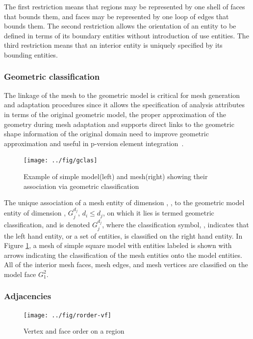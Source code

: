 The first restriction means that regions may be represented by one shell of faces that
bounds them, and faces may be represented by one loop of edges that bounds them. The
second restriction allows the orientation of an entity to be defined in terms of
its boundary entities without introduction of use entities. The third
restriction means that an interior entity is uniquely specified by its bounding entities.


\subsubsection{Geometric classification}

The linkage of the mesh to the geometric model is critical for mesh generation and adaptation 
procedures since it allows the specification of analysis 
attributes in terms of the original geometric model, the proper approximation of
the geometry during mesh adaptation and supports direct links to
the geometric shape information of the original domain need to improve geometric
approximation and useful in p-version element integration~\cite{beallthesis, beall97, shephard00}. 

\begin{figure}
\centering
\texttt{[image: ../fig/gclas]}
\caption[Example of simple model and mesh showing their association via geometric classification]
{Example of simple model(left) and mesh(right) showing
their association via geometric classification~\cite{simmetrixweb}} 
\label{gclas}  %
\end{figure}

The unique association of a mesh entity of dimension \di, \Mdii, to the
 geometric model entity of dimension \djj, $G^{d_j}_j$, $d_i \le d_j$, on which
 it lies is termed geometric classification, and is denoted \Mdiib\clas\blk
 $G^{d_j}_j$, where the classification symbol, \clas,
indicates that the left hand entity, or a set of entities, is classified on the right hand entity. In Figure \ref{gclas}, a mesh of simple square model with entities labeled
is shown with arrows indicating the classification of the mesh entities onto the model
entities. All of the interior mesh faces, mesh edges, and mesh vertices are classified
on the model face $G^2_1$.

\subsubsection{Adjacencies}
\begin{figure}
\centering
\texttt{[image: ../fig/rorder-vf]}
\caption[Vertex and face order on a region]
{Vertex and face order on a region~\cite{simmetrixweb}}
\label{rorder1}  
\end{figure}

